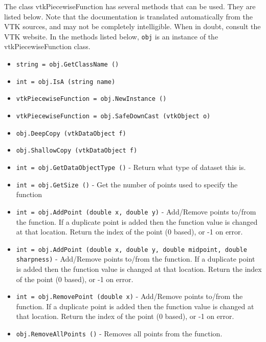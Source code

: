 The class vtkPiecewiseFunction has several methods that can be used.
  They are listed below.
Note that the documentation is translated automatically from the VTK sources,
and may not be completely intelligible.  When in doubt, consult the VTK website.
In the methods listed below, \verb|obj| is an instance of the vtkPiecewiseFunction class.
\begin{itemize}
\item  \verb|string = obj.GetClassName ()|

\item  \verb|int = obj.IsA (string name)|

\item  \verb|vtkPiecewiseFunction = obj.NewInstance ()|

\item  \verb|vtkPiecewiseFunction = obj.SafeDownCast (vtkObject o)|

\item  \verb|obj.DeepCopy (vtkDataObject f)|

\item  \verb|obj.ShallowCopy (vtkDataObject f)|

\item  \verb|int = obj.GetDataObjectType ()| -  Return what type of dataset this is.

\item  \verb|int = obj.GetSize ()| -  Get the number of points used to specify the function

\item  \verb|int = obj.AddPoint (double x, double y)| -  Add/Remove points to/from the function. If a duplicate point is added
 then the function value is changed at that location.
 Return the index of the point (0 based), or -1 on error.

\item  \verb|int = obj.AddPoint (double x, double y, double midpoint, double sharpness)| -  Add/Remove points to/from the function. If a duplicate point is added
 then the function value is changed at that location.
 Return the index of the point (0 based), or -1 on error.

\item  \verb|int = obj.RemovePoint (double x)| -  Add/Remove points to/from the function. If a duplicate point is added
 then the function value is changed at that location.
 Return the index of the point (0 based), or -1 on error.

\item  \verb|obj.RemoveAllPoints ()| -  Removes all points from the function. 


\end{itemize}
